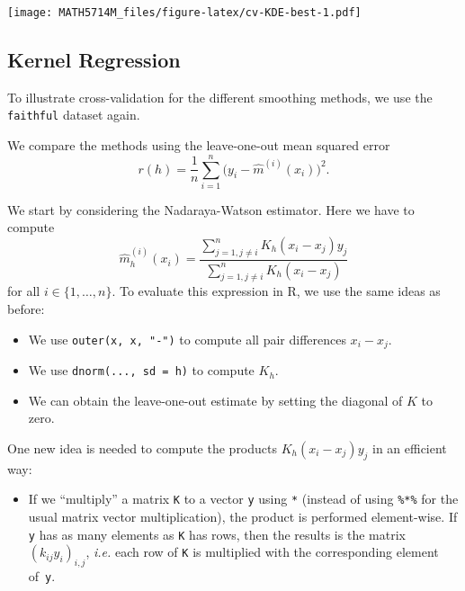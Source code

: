 \documentclass[
  a4paper,
]{article}
\newenvironment{Shaded}{\begin{snugshade}}{\end{snugshade}}
\newcommand{\NormalTok}[1]{#1}
\newcommand{\OtherTok}[1]{\textcolor[rgb]{0.56,0.35,0.01}{#1}}
\newcommand{\SpecialCharTok}[1]{\textcolor[rgb]{0.00,0.00,0.00}{#1}}
\providecommand{\tightlist}{%
  \setlength{\itemsep}{0pt}\setlength{\parskip}{0pt}}
\theoremstyle{definition}
\theoremstyle{definition}
\theoremstyle{definition}
\theoremstyle{definition}
\theoremstyle{remark}
\begin{document}
\texttt{[image: MATH5714M\_files/figure-latex/cv-KDE-best-1.pdf]}

\hypertarget{kernel-regression}{%
\subsection{Kernel Regression}\label{kernel-regression}}

To illustrate cross-validation for the different smoothing methods,
we use the \texttt{faithful} dataset again.

\begin{Shaded}
\end{Shaded}

We compare the methods using the leave-one-out mean squared error
\begin{equation*}
  r(h)
  = \frac1n \sum_{i=1}^n \bigl( y_i - \hat m^{(i)}(x_i) \bigr)^2.
\end{equation*}

We start by considering the Nadaraya-Watson estimator.
Here we have to compute
\begin{equation*}
  \hat m^{(i)}_h(x_i)
  = \frac{\sum_{j=1, j\neq i}^n K_h(x_i - x_j) y_j}{\sum_{j=1, j\neq i}^n K_h(x_i - x_j)}
\end{equation*}
for all \(i\in\{1, \ldots, n\}\).
To evaluate this expression in R, we use the same ideas as before:

\begin{itemize}
\tightlist
\item
  We use \texttt{outer(x,\ x,\ "-")} to compute all pair differences \(x_i - x_j\).
\item
  We use \texttt{dnorm(...,\ sd\ =\ h)} to compute \(K_h\).
\item
  We can obtain the leave-one-out estimate by setting the diagonal
  of \(K\) to zero.
\end{itemize}

One new idea is needed to compute the products \(K_h(x_i - x_j) y_j\)
in an efficient way:

\begin{itemize}
\tightlist
\item
  If we ``multiply'' a matrix \texttt{K} to a vector \texttt{y} using \texttt{*} (instead of using
  \texttt{\%*\%} for the usual matrix vector multiplication), the product is
  performed element-wise. If \texttt{y} has as many elements as \texttt{K} has rows,
  then the results is the matrix \((k_{ij}y_i)_{i,j}\), \emph{i.e.} each row
  of \texttt{K} is multiplied with the corresponding element of~\texttt{y}.
\end{itemize}
\end{document}

